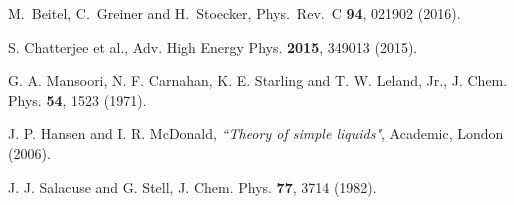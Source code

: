 \documentclass[12pt]{article}
\begin{document}
\begin{thebibliography}{99}
%
M.~Beitel, C.~Greiner and H.~Stoecker,
  Phys.\ Rev.\ C {\bf 94},  021902 (2016).


%
S. Chatterjee et al.,  Adv. High Energy Phys. {\bf 2015}, 349013 (2015).

 G. A. Mansoori, N. F. Carnahan, K. E. Starling and T. W. Leland, Jr., J. Chem. Phys. {\bf 54}, 1523 (1971).
 
 
%
J. P. Hansen and I. R. McDonald, {\it  ``Theory of  simple liquids"}, Academic, London (2006). 

%
J. J. Salacuse and G. Stell, 
J. Chem. Phys.  {\bf 77}, 3714 (1982).

%

  
\end{thebibliography}
\end{document}
